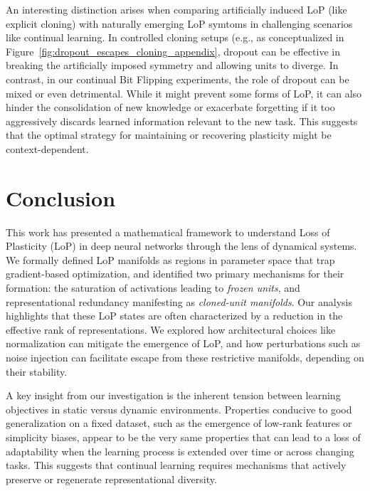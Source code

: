 \documentclass{article}
\newcommand{\IMZ}[1]{\todo[color=red!30,size=\tiny]{IMAN: #1}}
\numberwithin{figure}{section}
\begin{document}
An interesting distinction arises when comparing artificially induced LoP (like explicit cloning) with naturally emerging LoP symtoms in challenging scenarios like continual learning. In controlled cloning setups (e.g., as conceptualized in Figure~\ref{fig:dropout_escapes_cloning_appendix}, dropout can be effective in breaking the artificially imposed symmetry and allowing units to diverge. In contrast, in our continual Bit Flipping experiments, the role of dropout can be mixed or even detrimental. While it might prevent some forms of LoP, it can also hinder the consolidation of new knowledge or exacerbate forgetting if it too aggressively discards learned information relevant to the new task. This suggests that the optimal strategy for maintaining or recovering plasticity might be context-dependent.


\section{Conclusion}
\label{sec:discussion}
This work has presented a mathematical framework to understand Loss of Plasticity (LoP) in deep neural networks through the lens of dynamical systems. We formally defined LoP manifolds as regions in parameter space that trap gradient-based optimization, and identified two primary mechanisms for their formation: the saturation of activations leading to \emph{frozen units}, and representational redundancy manifesting as \emph{cloned-unit manifolds}. Our analysis highlights that these LoP states are often characterized by a reduction in the effective rank of representations. We explored how architectural choices like normalization can mitigate the emergence of LoP, and how perturbations such as noise injection can facilitate escape from these restrictive manifolds, depending on their stability.

A key insight from our investigation is the inherent tension between learning objectives in static versus dynamic environments. Properties conducive to good generalization on a fixed dataset, such as the emergence of low-rank features or simplicity biases, appear to be the very same properties that can lead to a loss of adaptability when the learning process is extended over time or across changing tasks. This suggests that continual learning requires mechanisms that actively preserve or regenerate representational diversity.
\end{document}
